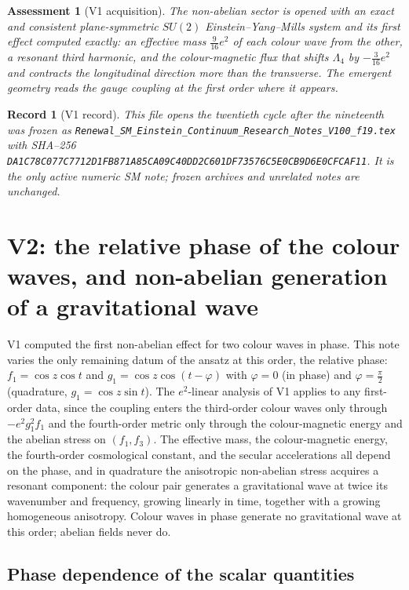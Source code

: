 \documentclass[11pt]{article}
\newtheorem{assessment}[theorem]{Assessment}
\newtheorem{record}[theorem]{Record}
\theoremstyle{remark}
\begin{document}
\begin{assessment}[V1 acquisition]
\label{ass:v20v1}
The non-abelian sector is opened with an exact and consistent
plane-symmetric \(SU(2)\) Einstein--Yang--Mills system and its first
effect computed exactly: an effective mass \(\tfrac9{16}e^2\) of each
colour wave from the other, a resonant third harmonic, and the
colour-magnetic flux that shifts \(\Lambda_4\) by \(-\tfrac3{16}e^2\)
and contracts the longitudinal direction more than the transverse.
The emergent geometry reads the gauge coupling at the first order
where it appears.
\end{assessment}

\begin{record}[V1 record]
\label{rec:v20v1}
This file opens the twentieth cycle after the nineteenth was frozen
as \texttt{Renewal\_SM\_Einstein\_Continuum\_Research\_Notes\_V100\_f19.tex}
with SHA--256
\texttt{DA1C78C077C7712D1FB871A85CA09C40DD2C601DF73576C5E0CB9D6E0CFCAF11}.
It is the only active numeric SM note; frozen archives and unrelated
notes are unchanged.
\end{record}


\section{V2: the relative phase of the colour waves, and non-abelian generation of a gravitational wave}
\label{sec:v20v2}

V1 computed the first non-abelian effect for two colour waves in
phase.  This note varies the only remaining datum of the ansatz at
this order, the relative phase: \(f_1=\cos z\cos t\) and
\(g_1=\cos z\cos(t-\varphi)\) with \(\varphi=0\) (in phase) and
\(\varphi=\tfrac\pi2\) (quadrature, \(g_1=\cos z\sin t\)).  The
\(e^2\)-linear analysis of V1 applies to any first-order data, since
the coupling enters the third-order colour waves only through
\(-e^2g_1^2f_1\) and the fourth-order metric only through the
colour-magnetic energy and the abelian stress on \((f_1,f_3)\).  The
effective mass, the colour-magnetic energy, the fourth-order
cosmological constant, and the secular accelerations all depend on
the phase, and in quadrature the anisotropic non-abelian stress
acquires a resonant component: the colour pair generates a
gravitational wave at twice its wavenumber and frequency, growing
linearly in time, together with a growing homogeneous anisotropy.
Colour waves in phase generate no gravitational wave at this order;
abelian fields never do.

\subsection{Phase dependence of the scalar quantities}
\end{document}
